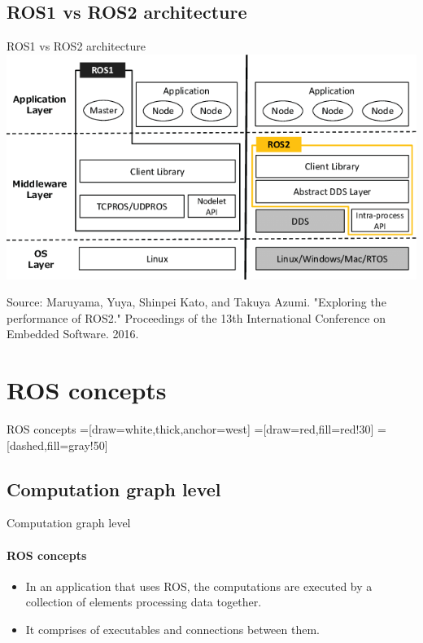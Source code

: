 \documentclass{beamer}
\begin{document}
\subsection{ROS1 vs ROS2 architecture}
\begin{frame}{ROS1 vs ROS2 architecture}
      \centering
    \includegraphics[width=1
    \linewidth]{figures/ros1vsros2.png}
    
\tiny{Source: Maruyama, Yuya, Shinpei Kato, and Takuya Azumi. "Exploring the performance of ROS2." Proceedings of the 13th International Conference on Embedded Software. 2016. }
\end{frame}


\section{ROS concepts}

\begin{frame}{ROS concepts}
=[draw=white,thick,anchor=west]
=[draw=red,fill=red!30]
=[dashed,fill=gray!50]
\end{frame}

\subsection{Computation graph level}

\begin{frame}{Computation graph level}
    \framesubtitle{ROS concepts}
    \begin{itemize}
        \item In an application that uses ROS, the computations are executed by a collection of elements processing data together.
        \item It comprises of executables and connections between them.
    \end{itemize}
\end{frame}
\end{document}
